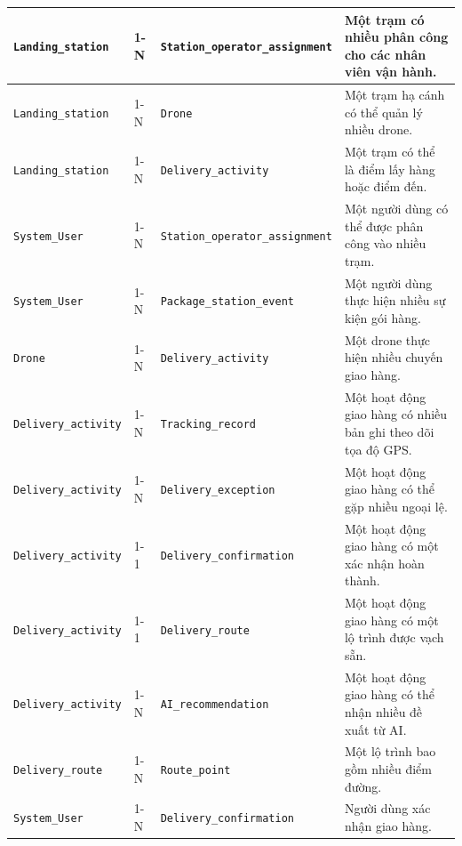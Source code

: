 \begin{longtable}{|p{3.4cm}|p{1cm}|p{5.3cm}|p{6cm}|}
\texttt{Landing\_station} & 
1-N & 
\texttt{Station\_operator\_assignment} & Một trạm có nhiều phân công cho các nhân viên vận hành. \\ \hline

\texttt{Landing\_station} & 
1-N & 
\texttt{Drone} & Một trạm hạ cánh có thể quản lý nhiều drone. \\ \hline

\texttt{Landing\_station} & 
1-N & 
\texttt{Delivery\_activity} & Một trạm có thể là điểm lấy hàng hoặc điểm đến. \\ \hline

\texttt{System\_User} & 
1-N & 
\texttt{Station\_operator\_assignment} & Một người dùng có thể được phân công vào nhiều trạm. \\ \hline

\texttt{System\_User} & 
1-N & 
\texttt{Package\_station\_event} & Một người dùng thực hiện nhiều sự kiện gói hàng. \\ \hline

\texttt{Drone} & 
1-N & 
\texttt{Delivery\_activity} & Một drone thực hiện nhiều chuyến giao hàng. \\ \hline

\texttt{Delivery\_activity} & 
1-N & 
\texttt{Tracking\_record} & Một hoạt động giao hàng có nhiều bản ghi theo dõi tọa độ GPS. \\ \hline

\texttt{Delivery\_activity} & 
1-N & 
\texttt{Delivery\_exception} & Một hoạt động giao hàng có thể gặp nhiều ngoại lệ. \\ \hline

\texttt{Delivery\_activity} & 
1-1 & 
\texttt{Delivery\_confirmation} & Một hoạt động giao hàng có một xác nhận hoàn thành. \\ \hline

\texttt{Delivery\_activity} & 
1-1 & 
\texttt{Delivery\_route} & Một hoạt động giao hàng có một lộ trình được vạch sẵn. \\ \hline

\texttt{Delivery\_activity} & 
1-N & 
\texttt{AI\_recommendation} & Một hoạt động giao hàng có thể nhận nhiều đề xuất từ AI. \\ \hline

\texttt{Delivery\_route} & 
1-N & 
\texttt{Route\_point} & Một lộ trình bao gồm nhiều điểm đường. \\ \hline

\texttt{System\_User} & 
1-N & 
\texttt{Delivery\_confirmation} & Người dùng xác nhận giao hàng. \\ \hline


\end{longtable}
